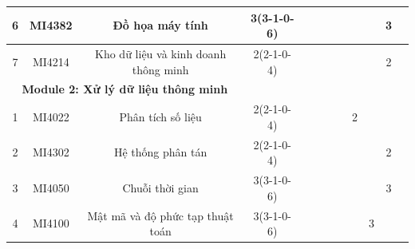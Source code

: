 \documentclass[12pt,a4paper]{report}
\begin{document}
\begin{landscape}
\begin{longtable}[c]{|c|c|c|c|c|c|c|c|c|c|c|c|}
        6                             & MI4382                          & Đồ họa máy tính                                              & 3(3-1-0-6)                                                                           &             &             &             &             &             &             & 3           &             \\ \hline
        7                             & MI4214                          & Kho dữ liệu và kinh doanh thông minh                         & 2(2-1-0-4)                                                                           &             &             &             &             &             &             & 2           &             \\ \hline
        \multicolumn{3}{|c|}{\textbf{Module 2: Xử lý dữ liệu thông minh}}                                                              &                                                                                      &             &             &             &             &             &             &             &             \\ \hline
        1                             & MI4022                          & Phân tích số liệu                                            & 2(2-1-0-4)                                                                           &             &             &             &             & 2           &             &             &             \\ \hline
        2                             & MI4302                          & Hệ thống phân tán                                            & 2(2-1-0-4)                                                                           &             &             &             &             &             &             & 2           &             \\ \hline
        3                             & MI4050                          & Chuỗi thời gian                                              & 3(3-1-0-6)                                                                           &             &             &             &             &             &             & 3           &             \\ \hline
        4                             & MI4100                          & Mật mã và độ phức tạp thuật toán                             & 3(3-1-0-6)                                                                           &             &             &             &             &             & 3           &             &             \\ \hline

\end{longtable}
\end{landscape}
\end{document}

